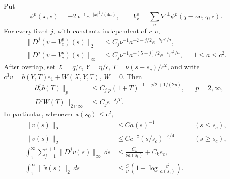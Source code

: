 \begin{lemma}
\label{sct:train}
Put
\[
 \psi^p(x,s)=-2a^{-1}e^{-|x|^2/(4a)},\qquad
 V_c^p=\sum_n\nabla^\perp\psi^p(q-nc,\eta,s).
\]
For every fixed $j$, with constants independent of $c,\nu$,
\begin{align}
 \|D^j(v-V_c^p)(s)\|_2
 &\leq C_j\nu^{-1}a^{-2-j/2}e^{-b_jc^2/a},\\
 \|D^j(v-V_c^p)(s)\|_\infty
 &\leq C_j\nu^{-1}a^{-(5+j)/2}e^{-b_jc^2/a},
 &&1\leq a\leq c^2. \label{sct:comparison}
\end{align}
After overlap, set $X=q/c$, $Y=\eta/c$,
$T=\nu(s-s_c)/c^2$, and write
$c^3v=b(Y,T)e_1+W(X,Y,T)$, $\overline W=0$. Then
\begin{align}
 \|\partial_Y^j b(T)\|_p
 &\leq C_{j,p}(1+T)^{-1-j/2+1/(2p)}, &&p=2,\infty,\\
 \|D^jW(T)\|_{2\cap\infty}&\leq C_j e^{-\lambda_jT}.
 \label{sct:overlap}
\end{align}
In particular, whenever $a(s_0)\leq c^2$,
\begin{align}
 \|v(s)\|_2&\leq Ca(s)^{-1} &&(s\leq s_c),\\
 \|v(s)\|_2&\leq Cc^{-2}(s/s_c)^{-3/4} &&(s\geq s_c),\\
 \int_{s_0}^\infty\sum_{j=1}^{k+1}\|D^jv(s)\|_\infty\,ds
 &\leq \frac{C_k}{\nu a(s_0)}+C_ke_c,\\
 \int_{s_0}^\infty\|\widetilde v(s)\|_2\,ds
 &\leq \frac C\nu\left(1+\log\frac{c^2}{a(s_0)}\right).
 \label{sct:integrated}
\end{align}
\end{lemma}

